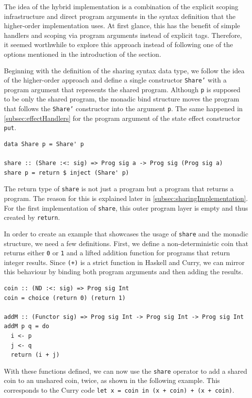 \documentclass[a4paper, 11pt, fleqn, twoside]{scrreprt}
\newcommand{\hinl}[1]{\texttt{#1}}
\begin{document}
The idea of the hybrid implementation is a combination of the explicit scoping infrastructure and direct program arguments in the syntax definition that the higher-order implementation uses.
At first glance, this has the benefit of simple handlers and scoping via program arguments instead of explicit tags.
Therefore, it seemed worthwhile to explore this approach instead of following one of the options mentioned in the introduction of the section.

Beginning with the definition of the sharing syntax data type, we follow the idea of the higher-order approach and define a single constructor \hinl{Share'} with a program argument that represents the shared program.
Although \hinl{p} is supposed to be only the shared program, the monadic bind structure moves the program that follows the \hinl{Share'} constructor into the argument \hinl{p}.
The same happened in \autoref{subsec:effectHandlers} for the program argument of the state effect constructor \hinl{put}.

\begin{verbatim}
data Share p = Share' p

share :: (Share :<: sig) => Prog sig a -> Prog sig (Prog sig a)
share p = return $ inject (Share' p)
\end{verbatim}

The return type of \hinl{share} is not just a program but a program that returns a program.
The reason for this is explained later in \autoref{subsec:sharingImplementation}.
For the first implementation of \hinl{share}, this outer program layer is empty and thus created by \hinl{return}.

In order to create an example that showcases the usage of \hinl{share} and the monadic structure, we need a few definitions.
First, we define a non-deterministic coin that returns either \hinl{0} or \hinl{1} and a lifted addition function for programs that return integer results.
Since \hinl{(+)} is a strict function in Haskell and Curry, we can mirror this behaviour by binding both program arguments and then adding the results.

\begin{verbatim}
coin :: (ND :<: sig) => Prog sig Int
coin = choice (return 0) (return 1)

addM :: (Functor sig) => Prog sig Int -> Prog sig Int -> Prog sig Int
addM p q = do
  i <- p 
  j <- q 
  return (i + j)
\end{verbatim}

With these functions defined, we can now use the \hinl{share} operator to add a shared coin to an unshared coin, twice, as shown in the following example.
This corresponds to the Curry code \hinl{let x = coin in (x + coin) + (x + coin)}.
\end{document}
